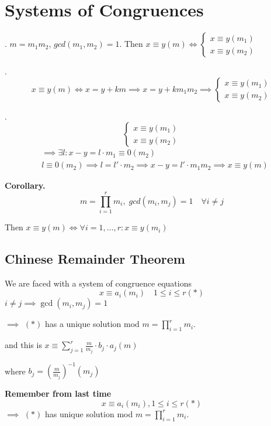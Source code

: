 
\section{Systems of Congruences}

\Theorem.
$m = m_1 m_2$, $gcd(m_1, m_2) = 1$. Then $x \equiv y (m) \iff \begin{cases} x \equiv y (m_1) \\ x \equiv y (m_2) \end{cases}$

\ProofForward.
\[
  x \equiv y (m) \iff x = y + km \implies x = y + k m_1 m_2 \implies
  \begin{cases}
    x \equiv y (m_1) \\
    x \equiv y (m_2)
  \end{cases}
\]

\ProofBackward.
\[
  \begin{cases}
    x \equiv y (m_1) \\
    x \equiv y (m_2)
  \end{cases}
\]
\begin{align*}
  & \implies \exists l: x-y = l\cdot m_1 \equiv 0 (m_2)\\
  & l \equiv 0 (m_2) \implies l = l' \cdot m_2
    \implies x-y = l'\cdot m_1 m_2
    \implies x \equiv y (m)
\end{align*}

\textbf{Corollary.}
\[
  m = \prod_{i=1}^r m_i,\; gcd(m_i, m_j) = 1 \quad \forall i \neq j
\]

Then $x \equiv y (m) \iff \forall i = 1, \ldots, r : x \equiv y (m_i)$

\subsection{Chinese Remainder Theorem}
We are faced with a system of congruence equations
\[
  x \equiv a_i (m_i) \quad 1 \leq i \leq r (*)
\]
$i \neq j \implies \gcd(m_i, m_j) = 1$

$\implies$ $(*)$ has a unique solution mod $\displaystyle{m = \prod_{i = 1}^r m_i}$.

and this is $\displaystyle{x \equiv \sum_{j=1}^r \frac {m}{m_j} \cdot b_j \cdot a_j (m)}$

where $b_j = \left( \frac{m}{m_j} \right) ^{-1} (m_j)$

\textbf{Remember from last time}
\[
  x \equiv a_i (m_i), 1 \leq i \leq r (*)
\]
$\implies$ $(*)$ has unique solution mod $\displaystyle{m = \prod_{i = 1}^r m_i}$.

